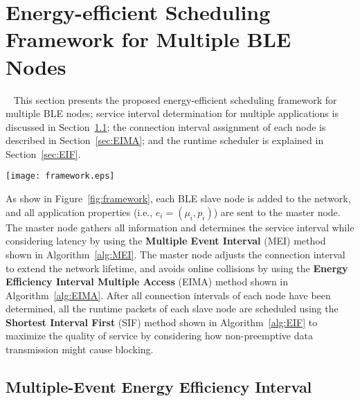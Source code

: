 \documentclass[10pt,journal,compsoc]{IEEEtran}
\begin{document}
\section{Energy-efficient Scheduling Framework for Multiple BLE Nodes}~\label{sec:WSN_SYS}
This section presents the proposed energy-efficient scheduling framework for multiple BLE nodes; service interval determination for multiple applications is discussed in Section~\ref{sec:MEI}; the connection interval assignment of each node is described in Section~\ref{sec:EIMA}; and the runtime scheduler is explained in Section~\ref{sec:EIF}.

\begin{figure*}[!tbhp]
\centering
\texttt{[image: framework.eps]}
\caption{The Energy-efficient Scheduling Framework for Multiple BLE Nodes}\label{fig:framework}
\end{figure*}

As show in Figure~{\ref{fig:framework}}, each BLE slave node is added to the network, and all application properties (i.e., $e_i=(\mu_i, p_i)$) are sent to the master node. The master node gathers all information and determines the service interval while considering latency by using the {\bf Multiple Event Interval} (MEI) method shown in Algorithm~\ref{alg:MEI}. The master node adjusts the connection interval to extend the network lifetime, and avoids online collisions by using the {\bf Energy Efficiency Interval Multiple Access} (EIMA) method shown in Algorithm~\ref{alg:EIMA}. After all connection intervals of each node have been determined, all the runtime packets of each slave node are scheduled using the {\bf Shortest Interval First} (SIF) method shown in Algorithm~\ref{alg:EIF} to maximize the quality of service by considering how non-preemptive data transmission might cause blocking.

\subsection{Multiple-Event Energy Efficiency Interval}\label{sec:MEI}
\end{document}

